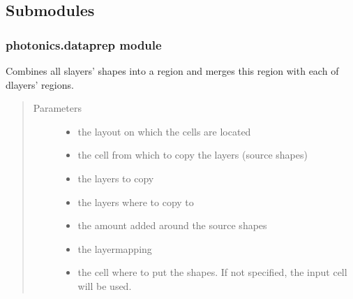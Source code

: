 \documentclass[a4paper,10pt,english]{sphinxmanual}
\begin{document}
\subsection{Submodules}
\label{\detokenize{photonics:submodules}}

\subsubsection{photonics.dataprep module}
\label{\detokenize{photonics:module-kppc.photonics.dataprep}}\label{\detokenize{photonics:photonics-dataprep-module}}

\begin{fulllineitems}
\label{\detokenize{photonics:kppc.photonics.dataprep.add}}
Combines all slayers’ shapes into a region and merges this region with each of dlayers’ regions.
\begin{quote}\begin{description}
\item[{Parameters}] \leavevmode\begin{itemize}
\item {} 
 \textendash{} the layout on which the cells are located

\item {} 
 \textendash{} the cell from which to copy the layers (source shapes)

\item {} 
 \textendash{} the layers to copy

\item {} 
 \textendash{} the layers where to copy to

\item {} 
 \textendash{} the amount added around the source shapes

\item {} 
 \textendash{} the layermapping

\item {} 
 \textendash{} the cell where to put the shapes. If not specified, the input cell will be used.

\end{itemize}

\end{description}\end{quote}

\end{fulllineitems}
\end{document}
